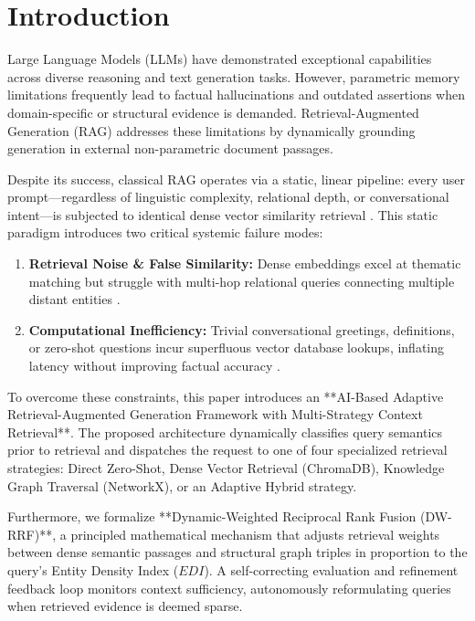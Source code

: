\documentclass[conference]{IEEEtran}
\begin{document}
\section{Introduction}
Large Language Models (LLMs) have demonstrated exceptional capabilities across diverse reasoning and text generation tasks. However, parametric memory limitations frequently lead to factual hallucinations and outdated assertions when domain-specific or structural evidence is demanded. Retrieval-Augmented Generation (RAG) \cite{lewis2020retrieval} addresses these limitations by dynamically grounding generation in external non-parametric document passages.

Despite its success, classical RAG operates via a static, linear pipeline: every user prompt—regardless of linguistic complexity, relational depth, or conversational intent—is subjected to identical dense vector similarity retrieval \cite{karpukhin2020dense}. This static paradigm introduces two critical systemic failure modes:
\begin{enumerate}
    \item \textbf{Retrieval Noise \& False Similarity:} Dense embeddings excel at thematic matching but struggle with multi-hop relational queries connecting multiple distant entities \cite{edge2024graphrag}.
    \item \textbf{Computational Inefficiency:} Trivial conversational greetings, definitions, or zero-shot questions incur superfluous vector database lookups, inflating latency without improving factual accuracy \cite{jeong2024adaptive}.
\end{enumerate}

To overcome these constraints, this paper introduces an **AI-Based Adaptive Retrieval-Augmented Generation Framework with Multi-Strategy Context Retrieval**. The proposed architecture dynamically classifies query semantics prior to retrieval and dispatches the request to one of four specialized retrieval strategies: Direct Zero-Shot, Dense Vector Retrieval (ChromaDB), Knowledge Graph Traversal (NetworkX), or an Adaptive Hybrid strategy.

Furthermore, we formalize **Dynamic-Weighted Reciprocal Rank Fusion (DW-RRF)**, a principled mathematical mechanism that adjusts retrieval weights between dense semantic passages and structural graph triples in proportion to the query's Entity Density Index ($EDI$). A self-correcting evaluation and refinement feedback loop monitors context sufficiency, autonomously reformulating queries when retrieved evidence is deemed sparse.
\end{document}
